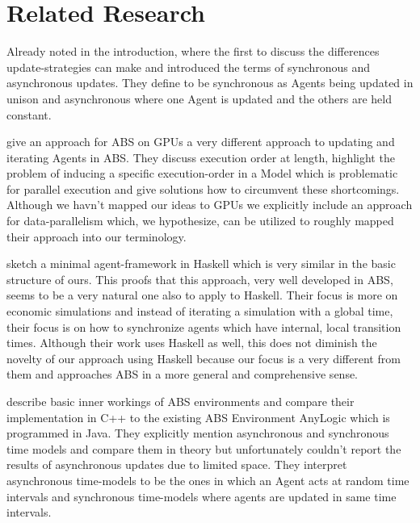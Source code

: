 \section{Related Research}
Already noted in the introduction, \cite{huberman_evolutionary_1993} where the first to discuss the differences update-strategies can make and introduced the terms of synchronous and asynchronous updates. They define to be synchronous as Agents being updated in unison and asynchronous where one Agent is updated and the others are held constant.

\medskip

\cite{a_framework_2008} give an approach for ABS on GPUs a very different approach to updating and iterating Agents in ABS. They discuss execution order at length, highlight the problem of inducing a specific execution-order in a Model which is problematic for parallel execution and give solutions how to circumvent these shortcomings. Although we havn't mapped our ideas to GPUs we explicitly include an approach for data-parallelism which, we hypothesize, can be utilized to roughly mapped their approach into our terminology. 
	
\medskip
	
\cite{botta_time_2010} sketch a minimal agent-framework in Haskell which is very similar in the basic structure of ours. This proofs that this approach, very well developed in ABS, seems to be a very natural one also to apply to Haskell. Their focus is more on economic simulations and instead of iterating a simulation with a global time, their focus is on how to synchronize agents which have internal, local transition times. Although their work uses Haskell as well, this does not diminish the novelty of our approach using Haskell because our focus is a very different from them and approaches ABS in a more general and comprehensive sense.

\medskip

\cite{dawson_opening_2014} describe basic inner workings of ABS environments and compare their implementation in C++ to the existing ABS Environment AnyLogic which is programmed in Java. They explicitly mention asynchronous and synchronous time models and compare them in theory but unfortunately couldn't report the results of asynchronous updates due to limited space. They interpret asynchronous time-models to be the ones in which an Agent acts at random time intervals and synchronous time-models where agents are updated in same time intervals.

\medskip

